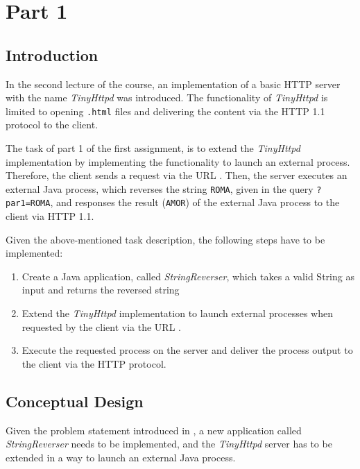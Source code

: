 \section{Part 1}\label{sec:01_part1}

\subsection{Introduction}\label{subsec:01_part1_intro}
In the second lecture of the course, an implementation of a basic HTTP server with the name \textit{TinyHttpd} was introduced.
The functionality of \textit{TinyHttpd} is limited to opening \texttt{.html} files and delivering the content via the HTTP 1.1 protocol to the client.


The task of part 1 of the first assignment, is to extend the \textit{TinyHttpd} implementation by implementing the functionality to launch an external process. Therefore, the client sends a request via the URL . Then, the server executes an external Java process, which reverses the string \texttt{ROMA}, given in the query \texttt{?par1=ROMA}, and responses the result (\texttt{AMOR}) of the external Java process to the client via HTTP 1.1.


Given the above-mentioned task description, the following steps have to be implemented:
\begin{enumerate}
\item Create a Java application, called \textit{StringReverser}, which takes a valid String as input and returns the reversed string
\item Extend the \textit{TinyHttpd} implementation to launch external processes when requested by the client via the URL .
\item Execute the requested process on the server and deliver the process output to the client via the HTTP protocol.
\end{enumerate}


\newpage
\subsection{Conceptual Design}\label{subsec:01_part1_design}
Given the problem statement introduced in , a new application called \textit{StringReverser} needs to be implemented, and the \textit{TinyHttpd} server has to be extended in a way to launch an external Java process.

